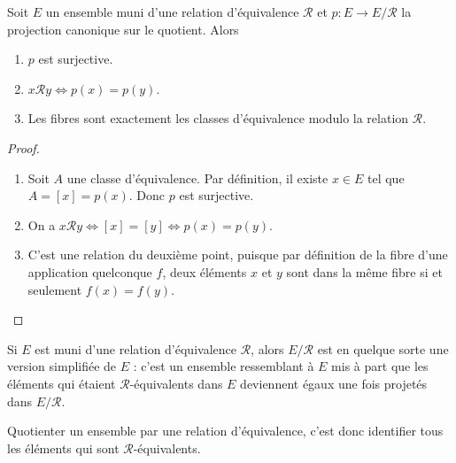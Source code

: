 \begin{proposition}
Soit $E$ un ensemble muni d'une relation d'équivalence ${\mathcal R}$ et $p : E\to E/\mathcal R$ la projection canonique sur le quotient. Alors 
\begin{enumerate}
\item $p$ est surjective.
\item $x\mathcal R y \iff p(x)=p(y)$.
\item Les fibres sont exactement les classes d'équivalence modulo la relation $\mathcal R$.
\end{enumerate}
\end{proposition}
\begin{proof}
\begin{enumerate}
\item Soit $A$ une classe d'équivalence. Par définition, il existe $x\in E$ tel que $A = [x] = p(x)$. Donc $p$ est surjective.
\item On a $x\mathcal R y \iff [x] = [y] \iff p(x)=p(y)$.
\item C'est une relation du deuxième point, puisque par définition de la fibre d'une application quelconque $f$, deux éléments $x$ et $y$ sont dans la même fibre si et seulement $f(x)=f(y)$.
\end{enumerate}
\end{proof}


\begin{mdframed}[linewidth=2]
Si $E$ est muni d'une relation d'équivalence $\mathcal R$, alors $E/\mathcal R$ est en quelque sorte une version  \og simplifiée\fg{} de $E$ : c'est un ensemble ressemblant à $E$ mis à part que les éléments qui étaient $\mathcal R$-équivalents dans $E$ deviennent égaux une fois projetés dans $E/\mathcal R$.

Quotienter un ensemble par une relation d'équivalence, c'est donc identifier tous les éléments qui sont $\mathcal R$-équivalents.
\end{mdframed}





